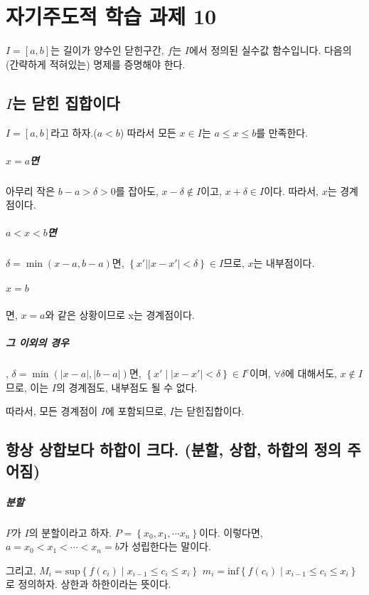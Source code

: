 \chapter{자기주도적 학습 과제 10}
$I=[a,b]$는 길이가 양수인 닫힌구간, $f$는 $I$에서 정의된 실수값 함수입니다. 다음의 (간략하게 적혀있는) 명제를 증명해야 한다.

\section{$I$는 닫힌 집합이다}
$I=[a,b]$라고 하자.($a<b$) 따라서 모든 $x \in I$는 $a \le x \le b$를 만족한다.
\paragraph{$x=a$면} 아무리 작은 $b-a>\delta>0$를 잡아도, $x-\delta \not\in I$이고, $x+\delta \in I$이다. 따라서, $x$는 경계점이다.
\paragraph{$a<x<b$면} $\delta = \min (x-a, b-a)$면, $\left\{x' | \left|x-x'\right|<\delta\right\} \in I$므로, $x$는 내부점이다.
\paragraph{$x=b$}면, $x=a$와 같은 상황이므로 x는 경계점이다.
\paragraph{그 이외의 경우}, $\delta = \min (|x-a|, |b-a|)$면, $\left\{x' \;|\; \left|x-x'\right|<\delta\right\} \in I^c$이며, $\forall \delta$에 대해서도, $x \not\in I$므로, 이는 $I$의 경계점도, 내부점도 될 수 없다.

따라서, 모든 경계점이 $I$에 포함되므로, $I$는 닫힌집합이다.


\section{항상 상합보다 하합이 크다. (분할, 상합, 하합의 정의 주어짐)}
\paragraph{분할}
$P$가 $I$의 분할이라고 하자. $P=\left\{x_0, x_1, \cdots x_n \right\}$이다. 이렇다면, $a=x_0 <x_1 < \cdots < x_n = b$가 성립한다는 말이다.


그리고,
$M_i = \mathrm{sup} \left\{ f(c_i) \;|\; x_{i-1} \le c_i \le x_i \right\}$
$m_i = \mathrm{inf} \left\{ f(c_i) \;|\; x_{i-1} \le c_i \le x_i \right\}$로 정의하자. 상한과 하한이라는 뜻이다.

